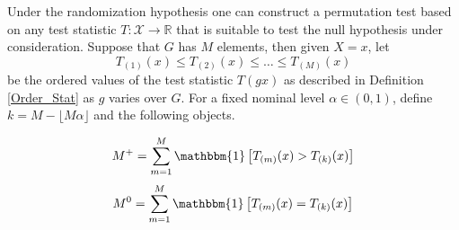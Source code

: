 \documentclass[12pt, a4paper]{article}
\theoremstyle{MAstyle} \newtheorem{assumption}{Assumption}[section]
\theoremstyle{MAstyle} \newtheorem{definition}{Definition}[section]
\theoremstyle{MAstyle} \newtheorem{theorem}{Theorem}[section]
\begin{document}
			Under the randomization hypothesis one can construct a permutation test based on any test statistic $T:\mathcal{X} \rightarrow \mathbb{R}$ that is suitable to test the null hypothesis under consideration. Suppose that $G$ has $M$ elements, then given $X = x$, let 
			$$T_{(1)}(x) \leq T_{(2)}(x) \leq \dots \leq T_{(M)}(x) $$
			be the ordered values of the test statistic $T(gx)$ as described in Definition \ref{Order_Stat} as $g$ varies over $G$. For a fixed nominal level $\alpha \in (0,1)$, define $k = M - \lfloor M\alpha \rfloor$ and the following objects.
			\begin{multicols}{2}
				\noindent
				\begin{equation*}
					M^{+} = \sum_{m = 1}^{M}\mathbbm{1}\left[T_{(m)}(x) > T_{(k)}(x)\right]
				\end{equation*}
				\begin{equation}
					M^{0} = \sum_{m = 1}^{M}\mathbbm{1}\left[T_{(m)}(x) = T_{(k)}(x)\right]
				\end{equation}
			\end{multicols}
			
\end{document}
